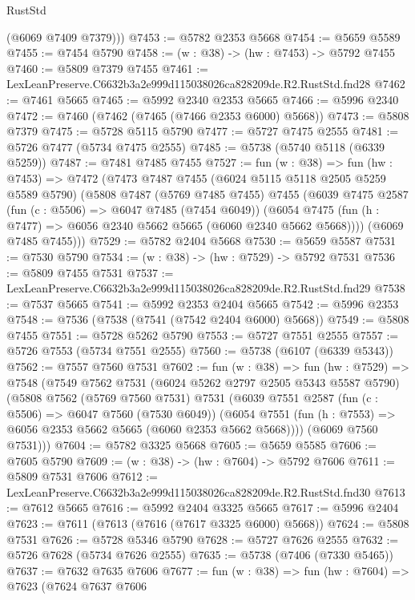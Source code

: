 \begin{lexlean}{RustStd}
\begin{coremodule}
        (@6069 @7409 @7379)))
@7453 := @5782 @2353 @5668
@7454 := @5659 @5589
@7455 := @7454 @5790
@7458 := (w : @38) -> (hw : @7453) -> @5792 @7455
@7460 := @5809 @7379 @7455
@7461 := LexLeanPreserve.C6632b3a2e999d115038026ca828209de.R2.RustStd.fnd28
@7462 := @7461 @5665
@7465 := @5992 @2340 @2353 @5665
@7466 := @5996 @2340
@7472 := @7460 (@7462 (@7465 (@7466 @2353 @6000) @5668))
@7473 := @5808 @7379
@7475 := @5728 @5115 @5790
@7477 := @5727 @7475 @2555
@7481 := @5726 @7477 (@5734 @7475 @2555)
@7485 := @5738 (@5740 @5118 (@6339 @5259))
@7487 := @7481 @7485 @7455
@7527 := fun (w : @38) =>
  fun (hw : @7453) =>
  @7472
    (@7473
      @7487
      @7455
      (@6024 @5115 @5118 @2505 @5259 @5589 @5790)
      (@5808
        @7487
        (@5769 @7485 @7455)
        @7455
        (@6039
          @7475
          @2587
          (fun (c : @5506) => @6047 @7485 (@7454 @6049))
          (@6054 @7475 (fun (h : @7477) => @6056 @2340 @5662 @5665 (@6060 @2340 @5662 @5668))))
        (@6069 @7485 @7455)))
@7529 := @5782 @2404 @5668
@7530 := @5659 @5587
@7531 := @7530 @5790
@7534 := (w : @38) -> (hw : @7529) -> @5792 @7531
@7536 := @5809 @7455 @7531
@7537 := LexLeanPreserve.C6632b3a2e999d115038026ca828209de.R2.RustStd.fnd29
@7538 := @7537 @5665
@7541 := @5992 @2353 @2404 @5665
@7542 := @5996 @2353
@7548 := @7536 (@7538 (@7541 (@7542 @2404 @6000) @5668))
@7549 := @5808 @7455
@7551 := @5728 @5262 @5790
@7553 := @5727 @7551 @2555
@7557 := @5726 @7553 (@5734 @7551 @2555)
@7560 := @5738 (@6107 (@6339 @5343))
@7562 := @7557 @7560 @7531
@7602 := fun (w : @38) =>
  fun (hw : @7529) =>
  @7548
    (@7549
      @7562
      @7531
      (@6024 @5262 @2797 @2505 @5343 @5587 @5790)
      (@5808
        @7562
        (@5769 @7560 @7531)
        @7531
        (@6039
          @7551
          @2587
          (fun (c : @5506) => @6047 @7560 (@7530 @6049))
          (@6054 @7551 (fun (h : @7553) => @6056 @2353 @5662 @5665 (@6060 @2353 @5662 @5668))))
        (@6069 @7560 @7531)))
@7604 := @5782 @3325 @5668
@7605 := @5659 @5585
@7606 := @7605 @5790
@7609 := (w : @38) -> (hw : @7604) -> @5792 @7606
@7611 := @5809 @7531 @7606
@7612 := LexLeanPreserve.C6632b3a2e999d115038026ca828209de.R2.RustStd.fnd30
@7613 := @7612 @5665
@7616 := @5992 @2404 @3325 @5665
@7617 := @5996 @2404
@7623 := @7611 (@7613 (@7616 (@7617 @3325 @6000) @5668))
@7624 := @5808 @7531
@7626 := @5728 @5346 @5790
@7628 := @5727 @7626 @2555
@7632 := @5726 @7628 (@5734 @7626 @2555)
@7635 := @5738 (@7406 (@7330 @5465))
@7637 := @7632 @7635 @7606
@7677 := fun (w : @38) =>
  fun (hw : @7604) =>
  @7623
    (@7624
      @7637
      @7606

\end{coremodule}
\end{lexlean}
